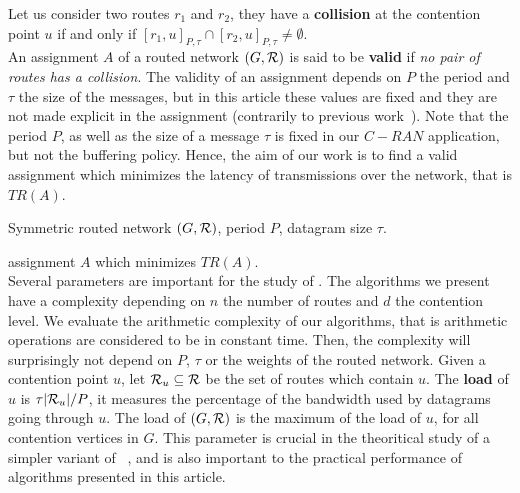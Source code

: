 \documentclass[english]{article}
\begin{document}
      Let us consider two routes $r_1$ and $r_2$, they have a {\bf collision} at the contention point $u$ if and only if $[r_1,u]_{P,\tau} \cap [r_2,u]_{P,\tau} \neq \emptyset$.\\

        An assignment $A$ of a routed network $(G,{\cal R})$ is said to be \textbf{valid} if \emph{no pair of routes has a collision}. 
        The validity of an assignment depends on $P$ the period and $\tau$ the size of the messages, but in this article these values are fixed and they are not made explicit in the assignment (contrarily to previous work~\cite{Guir1806:Deterministic}).
        Note that the period $P$, as well as the size of a message $\tau$ is fixed in our $C-RAN$ application, but not the buffering policy. Hence, the aim of our work is to find a valid assignment which minimizes the latency of transmissions over the network, that is $TR(A)$.
       \\ 
       

        Symmetric routed network $(G,{\cal R})$, period $P$, datagram size $\tau$.%
      

       assignment $A$ which minimizes $TR(A)$.
      \\
    
    Several parameters are important for the study of \spall. The algorithms we present have a complexity
    depending on $n$ the number of routes and $d$ the contention level. We evaluate the arithmetic complexity of our algorithms, that is arithmetic operations are considered to be in constant time. Then, the complexity will surprisingly not depend on $P$, $\tau$ or the weights of the routed network.
    Given a contention point $u$, let ${\cal R}_u \subseteq {\cal R}$ be the set of routes which contain $u$. The \textbf{load} of $u$ is $\tau|{\cal R}_u|/P$, it measures the percentage of the bandwidth used by datagrams going through $u$. The load of $(G,{\cal R})$ is the maximum of the load of $u$, for all contention vertices in $G$.
    This parameter is crucial in the theoritical study of a simpler variant of \spall~\cite{guiraud2020scheduling}, and is also important to the practical performance of algorithms presented in this article.
\end{document}
